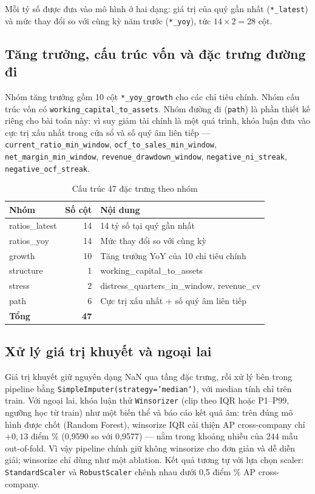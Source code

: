 Mỗi tỷ số được đưa vào mô hình ở hai dạng: giá trị của quý gần nhất (\texttt{*\_latest}) và mức thay
đổi so với cùng kỳ năm trước (\texttt{*\_yoy}), tức $14 \times 2 = 28$ cột.

\subsection{Tăng trưởng, cấu trúc vốn và đặc trưng đường đi}

Nhóm tăng trưởng gồm 10 cột \texttt{*\_yoy\_growth} cho các chỉ tiêu chính. Nhóm cấu trúc vốn có
\texttt{working\_capital\_to\_assets}. Nhóm đường đi (\texttt{path}) là phần thiết kế riêng cho bài
toán này: vì suy giảm tài chính là một quá trình, khóa luận đưa vào cực trị xấu nhất trong cửa sổ và
số quý âm liên tiếp — \texttt{current\_ratio\_min\_window}, \texttt{ocf\_to\_sales\_min\_window},
\texttt{net\_margin\_min\_window}, \texttt{revenue\_drawdown\_window},
\texttt{negative\_ni\_streak}, \texttt{negative\_ocf\_streak}.

\begin{table}[H]
\centering
\caption{Cấu trúc 47 đặc trưng theo nhóm}
\label{tab:feature_groups}
\begin{tabular}{|l|r|l|}
\hline
\textbf{Nhóm} & \textbf{Số cột} & \textbf{Nội dung} \\
\hline
ratios\_latest & 14 & 14 tỷ số tại quý gần nhất \\
ratios\_yoy    & 14 & Mức thay đổi so với cùng kỳ \\
growth         & 10 & Tăng trưởng YoY của 10 chỉ tiêu chính \\
structure      & 1  & working\_capital\_to\_assets \\
stress         & 2  & distress\_quarters\_in\_window, revenue\_cv \\
path           & 6  & Cực trị xấu nhất + số quý âm liên tiếp \\
\hline
\textbf{Tổng}  & \textbf{47} & \\
\hline
\end{tabular}
\end{table}

\subsection{Xử lý giá trị khuyết và ngoại lai}

Giá trị khuyết giữ nguyên dạng NaN qua tầng đặc trưng, rồi xử lý bên trong pipeline bằng
\texttt{SimpleImputer(strategy='median')}, với median tính chỉ trên train. Với ngoại lai, khóa luận
thử \texttt{Winsorizer} (clip theo IQR hoặc P1--P99, ngưỡng học từ train) như một biến thể và báo
cáo kết quả âm: trên đúng mô hình được chốt (Random Forest), winsorize IQR cải thiện AP
cross-company chỉ $+0{,}13$ điểm \% (0,9590 so với 0,9577) — nằm trong khoảng nhiễu của 244 mẫu
out-of-fold. Vì vậy pipeline chính giữ không winsorize cho đơn giản và dễ diễn giải; winsorize chỉ
dùng như một ablation. Kết quả tương tự với lựa chọn scaler: \texttt{StandardScaler} và
\texttt{RobustScaler} chênh nhau dưới 0,5 điểm \% AP cross-company.

